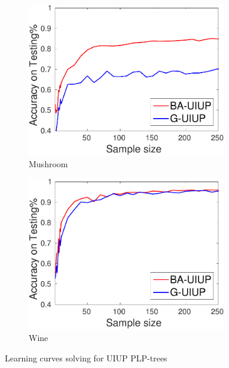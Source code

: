 {\begin{figure}
    \begin{subfigure}[b]{0.3\textwidth}
      \centering
      \includegraphics[width=0.95\textwidth]{figs/PrefLearnResults/Trees/MushroomDownsampled_Trees_X_MH.pdf}
			\captionsetup{font=scriptsize}
      \caption{Mushroom}
    \end{subfigure}
    \begin{subfigure}[b]{0.3\textwidth}
      \centering
      \includegraphics[width=0.95\textwidth]{figs/PrefLearnResults/Trees/WineDownsampled_Trees_X_MH.pdf}
			\captionsetup{font=scriptsize}
      \caption{Wine}
    \end{subfigure}

    \caption{Learning curves solving  for UIUP PLP-trees}
  \end{figure}
}

